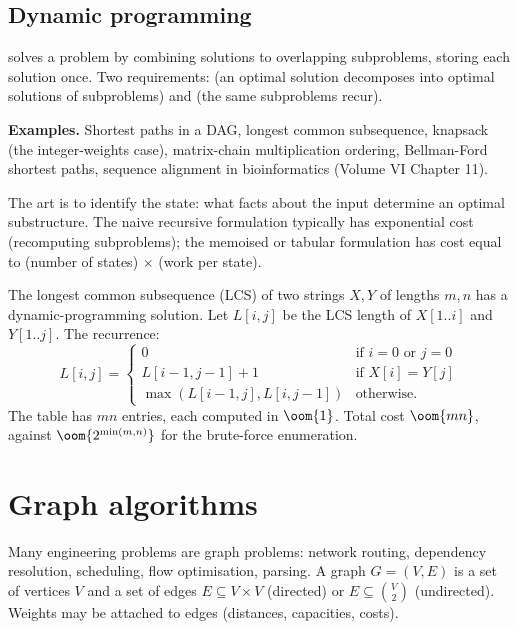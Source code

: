 \subsection{Dynamic programming}

 solves a problem by combining solutions to overlapping subproblems, storing each solution once. Two requirements:  (an optimal solution decomposes into optimal solutions of subproblems) and  (the same subproblems recur).

\textbf{Examples.} Shortest paths in a DAG, longest common subsequence, knapsack (the integer-weights case), matrix-chain multiplication ordering, Bellman-Ford shortest paths, sequence alignment in bioinformatics (Volume VI Chapter 11).

The art is to identify the state: what facts about the input determine an optimal substructure. The naive recursive formulation typically has exponential cost (recomputing subproblems); the memoised or tabular formulation has cost equal to (number of states) $\times$ (work per state).

\begin{example}
The longest common subsequence (LCS) of two strings $X, Y$ of lengths $m, n$ has a dynamic-programming solution. Let $L[i, j]$ be the LCS length of $X[1..i]$ and $Y[1..j]$. The recurrence:
\[
L[i, j] = \begin{cases}
  0 & \text{if } i = 0 \text{ or } j = 0 \\
  L[i-1, j-1] + 1 & \text{if } X[i] = Y[j] \\
  \max(L[i-1, j], L[i, j-1]) & \text{otherwise.}
\end{cases}
\]
The table has $mn$ entries, each computed in $\oom{1}$. Total cost $\oom{mn}$, against $\oom{2^{\min(m,n)}}$ for the brute-force enumeration.
\end{example}

\section{Graph algorithms}

Many engineering problems are graph problems: network routing, dependency resolution, scheduling, flow optimisation, parsing. A graph $G = (V, E)$ is a set of vertices $V$ and a set of edges $E \subseteq V \times V$ (directed) or $E \subseteq \binom{V}{2}$ (undirected). Weights may be attached to edges (distances, capacities, costs).

